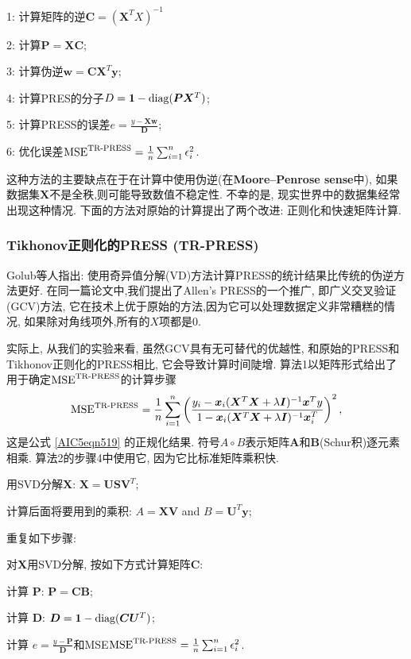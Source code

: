 1: 计算矩阵的逆$\bm C= (\bm X^T X)^{-1}$

2: 计算$\bm P = \bm X\bm C$;

3: 计算伪逆$\bm w = \bm C\bm X^T\bm y$;

4: 计算PRES的分子$D = \bm 1-\textup{diag}(\bm P\bm X^T)$;

5: 计算PRESS的误差$e = \frac{y-\bm X \bm w} {\bm D} $;

6: 优化误差$\textup{MSE}^{\textup{TR-PRESS}}=\frac 1 n \sum_{i=1}^n \epsilon_i^2$.

这种方法的主要缺点在于在计算中使用伪逆(在\textbf{Moore–Penrose sense}中), 如果数据集$\bm X$不是全秩,则可能导致数值不稳定性. 不幸的是, 现实世界中的数据集经常出现这种情况. 下面的方法对原始的计算提出了两个改进: 正则化和快速矩阵计算.
\subsubsection{Tikhonov正则化的PRESS (TR-PRESS)}
Golub等人\cite{golub1979 generalized}指出: 使用奇异值分解(VD)方法计算PRESS的统计结果比传统的伪逆方法更好.
在同一篇论文中,我们提出了Allen's PRESS的一个推广, 即广义交叉验证(GCV)方法, 它在技术上优于原始的方法,因为它可以处理数据定义非常糟糕的情况, 如果除对角线项外,所有的$X$项都是0.

实际上, 从我们的实验来看, 虽然GCV具有无可替代的优越性, 和原始的PRESS和Tikhonov正则化的PRESS相比, 它会导致计算时间陡增. 算法1以矩阵形式给出了用于确定$\textup{MSE}^{\textup{TR-PRESS}}$的计算步骤
\begin{align}
    \textup{MSE}^{\textup{TR-PRESS}}=\frac 1 n \sum_{i=1}^n \left( \frac{y_i-\bm x_i(\bm X^T \bm X+\lambda \bm I)^{-1}\bm x^T y  }
       {1-\bm x_i(\bm X^T \bm X+\lambda \bm I)^{-1}\bm x_i^T}\right)^2,
\end{align}
这是公式 \eqref{AIC5eqn519} 的正规化结果. 符号$A\circ B$表示矩阵$\bm A$和$\bm B$(Schur积)逐元素相乘. 算法2的步骤4中使用它, 因为它比标准矩阵乘积快.

用SVD分解$\bm X$: $\bm X = \bm U\bm S\bm V^T$;

计算后面将要用到的乘积: $A = \bm X\bm V$ and $B = \bm U^T\bm y$;

重复如下步骤:

对$\bm X$用SVD分解, 按如下方式计算矩阵$\bm C$:

计算 $\bm P$: $\bm P = \bm C\bm B$;

计算 $\bm D$: $\bm D = \bm 1-\textup{diag}(\bm C\bm U^T)$;

计算 $e = \frac{y-\bm P} {\bm D}$和MSE$\textup{MSE}^{\textup{TR-PRESS}}=\frac 1 n \sum_{i=1}^n \epsilon_i^2$.

